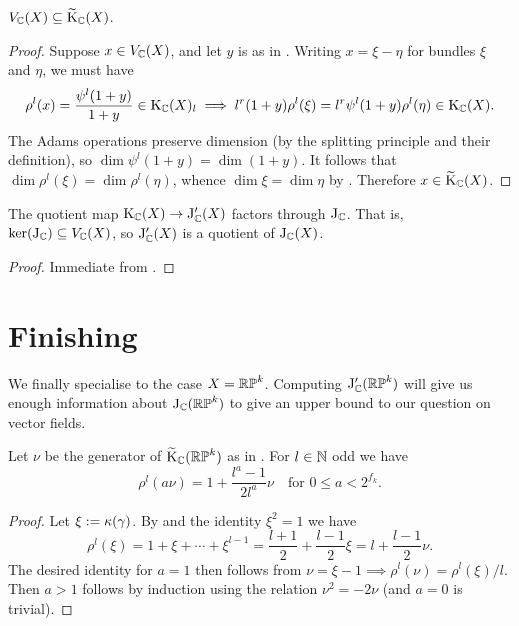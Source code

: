 \begin{lemma}
  \label{jprime-dim}
  $V_{\mathbb{C}}(X) \subseteq \widetilde{\mathrm{K}}_{\mathbb{C}}(X)$.
\end{lemma}

\begin{proof}
  Suppose $x \in V_{\mathbb{C}}(X)$, and let $y$ is as in . Writing
  $x = \xi - \eta$ for bundles $\xi$ and $\eta$, we must have
  \[
  \rho^l(x) = \frac{\psi^l(1+y)}{1+y} \in \mathrm{K}_{\mathbb{C}}(X)_l \implies
  l^r(1+y)\rho^l(\xi) = l^r\psi^l(1+y)\rho^l(\eta) \in \mathrm{K}_{\mathbb{C}}(X).
  \]
  The Adams operations preserve dimension (by the splitting principle
  and their definition), so $\dim \psi^l(1+y) = \dim {(1+y)}$. It
  follows that $\dim \rho^l(\xi) = \dim \rho^l(\eta)$, whence $\dim
  \xi = \dim \eta$ by . Therefore $x \in
  \widetilde{\mathrm{K}}_{\mathbb{C}}(X)$.
\end{proof}

\begin{proposition}
  \label{jprime-bound}
  The quotient map $\mathrm{K}_{\mathbb{C}}(X) \to \mathrm{J}_{\mathbb{C}}'(X)$ factors through
  $\mathrm{J}_{\mathbb{C}}$. That is, $\ker(\mathrm{J}_{\mathbb{C}}) \subseteq V_{\mathbb{C}}(X)$, so $\mathrm{J}_{\mathbb{C}}'(X)$
  is a quotient of $\mathrm{J}_{\mathbb{C}}(X)$.
\end{proposition}

\begin{proof}
  Immediate from .
\end{proof}


\section{Finishing}

We finally specialise to the case $X = \mathbb{RP}^k$. Computing
$\mathrm{J}_{\mathbb{C}}'(\mathbb{RP}^k)$ will give us enough information about $\mathrm{J}_{\mathbb{C}}(\mathbb{RP}^k)$
to give an upper bound to our question  on vector
fields.

\begin{lemma}
  \label{RP-cannibal}
  Let $\nu$ be the generator of $\widetilde{\mathrm{K}}_{\mathbb{C}}(\mathbb{RP}^k)$ as in
  . For $l \in \mathbb{N}$ odd we have
  \[
  \rho^l(a\nu) = 1 + \frac{l^a-1}{2l^a}\nu \quad\text{for }0 \le a <
  2^{f_k}.
  \]
\end{lemma}

\begin{proof}
  Let $\xi \mathrel{:=} \kappa(\gamma)$. By  and the
  identity $\xi^2 = 1$ we have
  \[
  \rho^l(\xi) = 1 + \xi + \cdots + \xi^{l-1} = \frac{l+1}2 +
  \frac{l-1}2\xi = l + \frac{l-1}{2}\nu.
  \]
  The desired identity for $a=1$ then follows from $\nu = \xi - 1
  \implies \rho^l(\nu) = \rho^l(\xi)/l$. Then $a > 1$ follows by
  induction using the relation $\nu^2 = -2\nu$ (and $a=0$ is trivial).
\end{proof}

